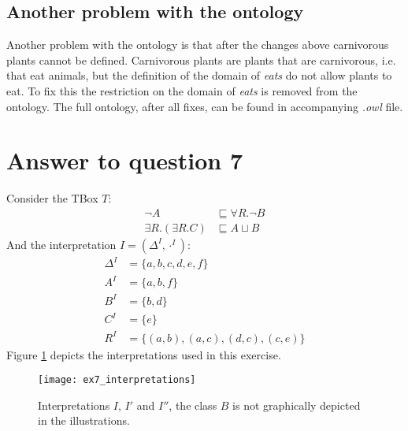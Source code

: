 \documentclass[a4paper,12pt]{article}
\begin{document}
\subsection[Fixed ontology]{Another problem with the ontology}
\label{fixdomain}
Another problem with the ontology is that after the changes above carnivorous
plants cannot be defined.  Carnivorous plants are plants that are carnivorous,
i.e. that eat animals, but the definition of the domain of \emph{eats} do not
allow plants to eat.  To fix this the restriction on the domain of \emph{eats}
is removed from the ontology.  The full ontology, after all fixes, can be found
in accompanying \emph{.owl} file.

\section[Question 7]{Answer to question 7}

Consider the TBox $T$:
\begin{align*}
                 \neg A &\sqsubseteq \forall R.\neg B\\
\exists R.(\exists R.C) &\sqsubseteq A \sqcup B
\end{align*}
And the interpretation $ I = (\Delta^I, \cdot^I) $:
\begin{align*}
\Delta^I &= \{a,b,c,d,e,f\}\\
     A^I &= \{a,b,f\}\\
     B^I &= \{b,d\}\\
     C^I &= \{e\}\\
     R^I &= \{(a,b),(a,c),(d,c),(c,e)\}
\end{align*}
Figure \ref{interpretations} depicts the interpretations used in this exercise.

\begin{figure}[bp]
\centering
\texttt{[image: ex7\_interpretations]}
\caption{Interpretations $I$, $I'$ and $I''$, the class $B$ is not graphically
depicted in the illustrations.}
\label{interpretations}
\end{figure}
\end{document}
